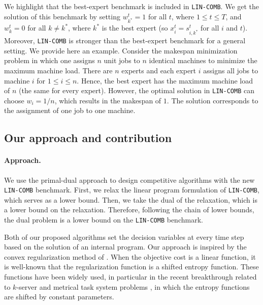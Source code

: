 We highlight that the best-expert benchmark is included in \texttt{LIN-COMB}. We get the solution of this benchmark by setting $w^{t}_{k^{*}} = 1$ for all $t$, where $1 \leq t \leq T$, and $w^{t}_{k} = 0$ for all $k \neq k^{*}$,
where $k^{*}$ is the best expert (so $x_{i}^{t} = s_{i,k^{*}}^{t}$ for all $i$ and $t$).
Moreover, \texttt{LIN-COMB} is stronger than the best-expert benchmark for a general setting. We provide here an example. 
Consider the makespan minimization problem in which one assigns $n$ unit jobs to $n$ identical machines to minimize the maximum machine load.   
There are $n$ experts and each expert $i$ assigns all jobs to machine $i$ for $1 \leq i \leq n$. Hence, the best expert has the maximum machine load of $n$ (the same for every expert). However, the optimal solution in \texttt{LIN-COMB} can choose $w_{i} = 1/n$, which results in the makespan of $1$. The solution corresponds to the assignment of one job to one machine.  

\subsection{Our approach and contribution}

\paragraph{Approach.} We use the primal-dual approach to design competitive algorithms with the new \texttt{LIN-COMB} benchmark. First, we relax the linear program formulation of \texttt{LIN-COMB}, which serves as a lower bound. Then, we take the dual of the relaxation, which is a lower bound on the relaxation. Therefore, following the chain of lower bounds, the dual problem is a lower bound on the \texttt{LIN-COMB} benchmark. 

Both of our proposed algorithms set the decision variables at every time step based on the solution of an internal program. Our approach is inspired by the
convex regularization method of \cite{BuchbinderChen14:Competitive-Analysis}.
When the objective cost is a linear function, it is well-known that the regularization function is a shifted entropy function.
These functions have been widely used, in particular in the recent breakthrough related to $k$-server \cite{BubeckCohen18:K-server-via-multiscale,BuchbinderGupta19:k-servers-with}
and metrical task system problems \cite{BubeckCohen21:Metrical-task},
in which the entropy functions are shifted by constant parameters.

